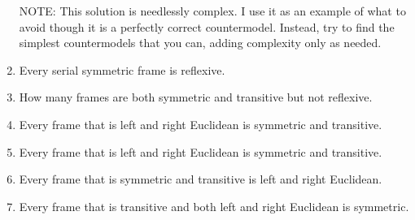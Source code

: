 \documentclass[a4paper, 11pt]{article}                  %
\begin{document}
\begin{enumerate}
{		      \noindent
		      NOTE: This solution is needlessly complex.
		      I use it as an example of what to avoid though it is a perfectly correct countermodel.
		      Instead, try to find the simplest countermodels that you can, adding complexity only as needed.


	      }

	\item Every serial symmetric frame is reflexive.

	\item How many frames are both symmetric and transitive but not reflexive.

	\item Every frame that is left and right Euclidean is symmetric and transitive.

	\item Every frame that is left and right Euclidean is symmetric and transitive.

	\item Every frame that is symmetric and transitive is left and right Euclidean.

	\item Every frame that is transitive and both left and right Euclidean is symmetric.


\end{enumerate}
\end{document}
